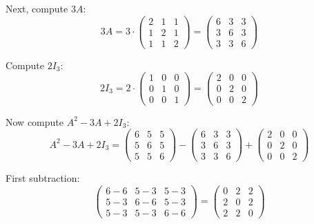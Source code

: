 \documentclass[12pt]{article}
\begin{document}
\begin{answerbox}
\begin{enumerate}
    Next, compute $ 3A $:
    $$
    3A = 3 \cdot \begin{pmatrix} 2 & 1 & 1 \\ 1 & 2 & 1 \\ 1 & 1 & 2 \end{pmatrix} =
    \begin{pmatrix}
    6 & 3 & 3 \\
    3 & 6 & 3 \\
    3 & 3 & 6
    \end{pmatrix}
    $$

    Compute $ 2I_3 $:
    $$
    2I_3 = 2 \cdot \begin{pmatrix} 1 & 0 & 0 \\ 0 & 1 & 0 \\ 0 & 0 & 1 \end{pmatrix} =
    \begin{pmatrix}
    2 & 0 & 0 \\
    0 & 2 & 0 \\
    0 & 0 & 2
    \end{pmatrix}
    $$

    Now compute $ A^2 - 3A + 2I_3 $:
    $$
    A^2 - 3A + 2I_3 = 
    \begin{pmatrix}
    6 & 5 & 5 \\
    5 & 6 & 5 \\
    5 & 5 & 6
    \end{pmatrix}
    -
    \begin{pmatrix}
    6 & 3 & 3 \\
    3 & 6 & 3 \\
    3 & 3 & 6
    \end{pmatrix}
    +
    \begin{pmatrix}
    2 & 0 & 0 \\
    0 & 2 & 0 \\
    0 & 0 & 2
    \end{pmatrix}
    $$

    First subtraction:
    $$
    \begin{pmatrix}
    6-6 & 5-3 & 5-3 \\
    5-3 & 6-6 & 5-3 \\
    5-3 & 5-3 & 6-6
    \end{pmatrix}
    =
    \begin{pmatrix}
    0 & 2 & 2 \\
    2 & 0 & 2 \\
    2 & 2 & 0
    \end{pmatrix}
    $$


\end{enumerate}
\end{answerbox}
\end{document}
